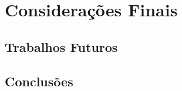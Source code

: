 \chapter{Considerações Finais}
\label{cap-conclusoes}

\section{Trabalhos Futuros}

\section{Conclusões}
